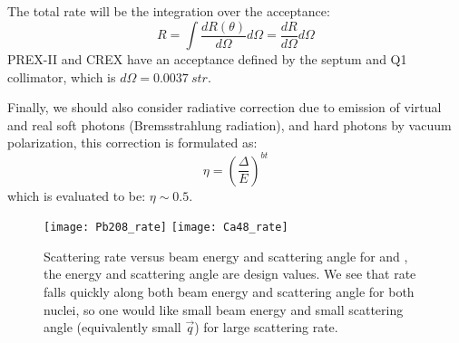 The total rate will be the integration over the acceptance:
\begin{equation}
    R = \int \frac{dR(\theta)}{d\Omega} d\Omega = \frac{dR}{d\Omega} d\Omega
\end{equation}
PREX-II and CREX have an acceptance defined by the septum and Q1 collimator, which
is $d\Omega = 0.0037 \ str$.

Finally, we should also consider radiative correction due to emission of virtual
and real soft photons (Bremsstrahlung radiation), and hard photons by vacuum polarization,
this correction is formulated as:
\begin{equation}
    \eta = \left(\frac{\Delta}{E} \right)^{bt}
\end{equation}
which is evaluated to be: $\eta \sim 0.5$.

\begin{figure}[h!]
    \texttt{[image: Pb208\_rate]}
    \texttt{[image: Ca48\_rate]}
    \caption{Scattering rate versus beam energy and scattering angle for \Pb and \Ca,
    the energy and scattering angle are design values.
    We see that rate falls quickly along both beam energy and scattering angle for
    both nuclei, so one would like small beam energy and small scattering angle (equivalently
    small $\vec{q}$) for large scattering rate.}
\end{figure}

